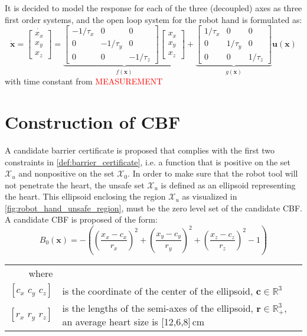 It is decided to model the response for each of the three (decoupled) axes as three first order systems, and the open loop system for the robot hand is formulated as:
\begin{equation}\label{eq:3D_sys_static_openloop}
\dot{\mathbf{x}}=
\dot{\begin{bmatrix}
x_x\\x_y\\x_z
\end{bmatrix}} =
\underbrace{\begin{bmatrix}
-1/\tau_x & 0 & 0\\0 & -1/\tau_y & 0 \\ 0 & 0 & -1/\tau_z
\end{bmatrix}
\begin{bmatrix}
x_x\\x_y\\x_z
\end{bmatrix}}_{f(\mathbf{x})} +
\underbrace{\begin{bmatrix}
1/\tau_x& 0 & 0 \\ 0& 1/\tau_y & 0 \\0& 0& 1/\tau_z
\end{bmatrix}}_{g(\mathbf{x})}
\mathbf{u}(\mathbf{x})
\end{equation}
with time constant from \textcolor{red}{MEASUREMENT}

\section{Construction of CBF}
A candidate barrier certificate is proposed that complies with the first two constraints in \autoref{def:barrier_certificate}, i.e. a function that is positive on the set $\mathcal{X}_u$ and nonpositive on the set $\mathcal{X}_0$. In order to make sure that the robot tool will not penetrate the heart, the unsafe set $\mathcal{X}_u$ is defined as an ellipsoid representing the heart. This ellipsoid enclosing the region $\mathcal{X}_u$ as visualized in \autoref{fig:robot_hand_unsafe_region}, must be the zero level set of the candidate CBF. A candidate CBF is proposed of the form:
\begin{equation}
	B_0(\mathbf{x}) = -\left(  \left(\frac{x_x-c_x}{r_x}\right)^2 + \left(\frac{x_y-c_y}{r_y}\right)^2 + \left(\frac{x_z-c_z}{r_z}\right)^2 - 1 \right)\label{eq:barrier_3d}
\end{equation}
\begin{tabular}{rl}
	where&\\
	$[c_x\,\, c_y\,\, c_z]$ & is the coordinate of the center of the ellipsoid, $\mathbf{c}\in\mathbb{R}^3$ \\
	$[r_x\,\, r_y\,\, r_z]$ & is the lengths of the semi-axes of the ellipsoid, $\mathbf{r}\in\mathbb{R}^3_+$, an average heart size is [12,6,8]\,cm\\
\end{tabular}\\

